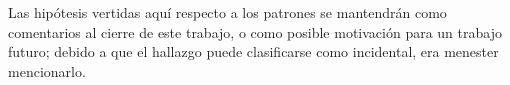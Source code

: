 Las hip\'otesis vertidas aqu\'i respecto a los patrones se mantendr\'an como comentarios
al cierre de este trabajo,
o como posible motivaci\'on para un trabajo futuro;
debido a que el hallazgo puede clasificarse como incidental, era menester mencionarlo.

